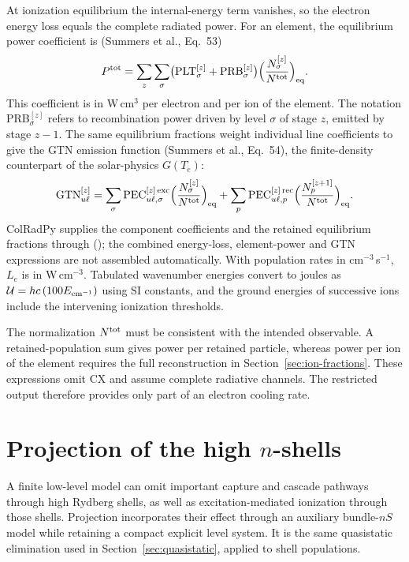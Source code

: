 \documentclass[11pt,a4paper]{article}
\newcommand{\code}[1]{\texttt{\detokenize{#1}}}
\newcommand{\routine}[1]{\textsf{\detokenize{#1}}}
\numberwithin{equation}{section}
\begin{document}
At ionization equilibrium the internal-energy term vanishes, so the
electron energy loss equals the complete radiated power. For an
element, the equilibrium power coefficient is (Summers et al., Eq.~53)
\begin{equation}\label{eq:ptot}
 P^{\rm tot}=\sum_z\sum_\sigma\bigl(\mathrm{PLT}^{[z]}_\sigma+\mathrm{PRB}^{[z]}_\sigma\bigr)
   \Bigl(\frac{N^{[z]}_\sigma}{N^{\rm tot}}\Bigr)_{\rm eq}.
\end{equation}
This coefficient is in W\,cm$^3$ per electron and per ion of the
element. The notation PRB$^{[z]}_\sigma$ refers to recombination
power driven by level $\sigma$ of stage $z$, emitted by stage $z-1$.
The same equilibrium fractions weight individual line coefficients
to give the GTN emission function (Summers et al., Eq.~54), the
finite-density counterpart of the solar-physics $G(T_e)$:
\begin{equation}\label{eq:gtn}
 \mathrm{GTN}^{[z]}_{u\ell}=\sum_\sigma\mathrm{PEC}^{[z]\,\rm exc}_{u\ell,\sigma}
   \Bigl(\frac{N^{[z]}_\sigma}{N^{\rm tot}}\Bigr)_{\rm eq}
  +\sum_p\mathrm{PEC}^{[z]\,\rm rec}_{u\ell,p}
   \Bigl(\frac{N^{[z+1]}_p}{N^{\rm tot}}\Bigr)_{\rm eq}.
\end{equation}
ColRadPy supplies the component coefficients and the retained
equilibrium fractions through \routine{ionization_balance}
(\code{processed['pops_ss']}); the combined energy-loss, element-power
and GTN expressions are not assembled automatically. With population
rates in cm$^{-3}$\,s$^{-1}$, $L_e$ is in W\,cm$^{-3}$.
Tabulated wavenumber energies convert to joules as
$\mathcal U=hc\,(100E_{\rm cm^{-1}})$ using SI constants, and the
ground energies of successive ions include the intervening ionization
thresholds.

The normalization $N^{\rm tot}$ must be consistent with the intended
observable. A retained-population sum gives power per retained
particle, whereas power per ion of the element requires the full
reconstruction in Section~\ref{sec:ion-fractions}. These expressions
omit CX and assume complete radiative channels. The restricted
\code{prb} output therefore provides only part of an electron cooling
rate.

\section{Projection of the high \texorpdfstring{$n$}{n}-shells}\label{sec:projection}

A finite low-level model can omit important capture and cascade
pathways through high Rydberg shells, as well as excitation-mediated
ionization through those shells. Projection incorporates their effect
through an auxiliary bundle-$nS$ model while retaining a compact
explicit level system. It is the same quasistatic elimination used
in Section~\ref{sec:quasistatic}, applied to shell populations.
\end{document}
